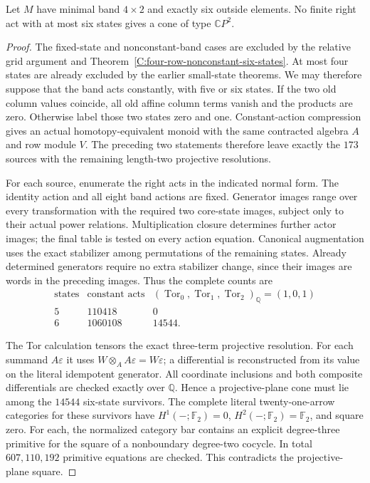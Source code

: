 \begin{theorem}
\label{C:four-row-six-outside-six-state-cones}
Let $M$ have minimal band $4\times2$ and exactly six outside elements.
No finite right act with at most six states gives a cone of type
$\mathbb CP^2$.
\end{theorem}
\begin{proof}
The fixed-state and nonconstant-band cases are excluded by the
relative grid argument and
Theorem~\ref{C:four-row-nonconstant-six-states}.
At most four states are already excluded by the earlier small-state
theorems.  We may therefore suppose that the band acts constantly,
with five or six states.  If the two old column values coincide,
all old affine column terms vanish and the products are zero.
Otherwise label those two states zero and one.
Constant-action compression gives an actual homotopy-equivalent
monoid with the same contracted algebra $A$ and row module $V$.
The preceding two statements therefore leave exactly the $173$
sources with the remaining length-two projective resolutions.

For each source, enumerate the right acts in the indicated normal
form.  The identity action and all eight band actions are fixed.
Generator images range over every transformation with the required
two core-state images, subject only to their actual power relations.
Multiplication closure determines further actor images; the final
table is tested on every action equation.  Canonical augmentation
uses the exact stabilizer among permutations of the remaining states.
Already determined generators require no extra stabilizer change,
since their images are words in the preceding images.
Thus the complete counts are
\[
\begin{array}{c|r|r}
\text{states}&\text{constant acts}&
 (\operatorname{Tor}_0,\operatorname{Tor}_1,
 \operatorname{Tor}_2)_{\mathbb Q}=(1,0,1)\\\hline
5&110418&0\\
6&1060108&14544.
\end{array}
\]

The Tor calculation tensors the exact three-term projective
resolution.  For each summand $A\varepsilon$ it uses
$W\otimes_AA\varepsilon=W\varepsilon$; a differential is
reconstructed from its value on the literal idempotent generator.
All coordinate inclusions and both composite differentials are
checked exactly over $\mathbb Q$.
Hence a projective-plane cone must lie among the $14544$ six-state
survivors.  The complete literal twenty-one-arrow categories for
these survivors have $H^1(-;\mathbb F_2)=0$,
$H^2(-;\mathbb F_2)=\mathbb F_2$, and square zero.
For each, the normalized category bar contains an explicit
degree-three primitive for the square of a nonboundary degree-two
cocycle.  In total $607{,}110{,}192$ primitive equations are checked.
This contradicts the projective-plane square.


\end{proof}
